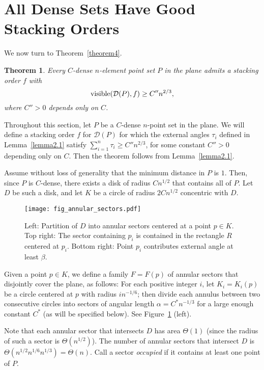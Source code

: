 \documentclass[11pt]{article}
\newtheorem{thm}{Theorem}             \newtheorem{lem}[thm]{Lemma}
\DeclareMathOperator{\vis}{\mathrm{visible}}
\begin{document}
\section{All Dense Sets Have Good Stacking Orders}

We now turn to Theorem~\ref{theorem4}.

{
\renewcommand{\thethm}{4}
\begin{thm} Every $C$-dense $n$-element point set $P$ in the plane admits a stacking order $f$ with
$$ \vis({\cal D}(P),f)\ge C''n^{2/3},$$
where $C''>0$ depends only on $C$.
\end{thm}
\addtocounter{thm}{-1}
}

Throughout this section, let $P$ be a $C$-dense $n$-point set
in the plane. We will define a stacking order $f$ for $\mathcal D(P)$ for
which the
external angles $\tau_i$ defined in Lemma~\ref{lemma2.1} satisfy
$\sum_{i=1}^n \tau_i \ge C''n^{2/3}$, for some constant
$C''>0$ depending only on $C$. Then the theorem follows from
Lemma~\ref{lemma2.1}.

Assume without loss of generality that the minimum  distance in
$P$ is $1$. Then, since $P$ is $C$-dense, there exists a disk
of radius $C n^{1/2}$ that contains all of $P$. Let $D$ be such
a disk, and let $K$ be a circle of radius $2Cn^{1/2}$
concentric with $D$.

\begin{figure}
\centerline{\texttt{[image: fig\_annular\_sectors.pdf]}}
\caption{\label{fig_annular_sectors}Left: Partition of $D$ into annular sectors
centered at a point $p\in K$. Top right: The sector containing $p_i$ is contained in
the rectangle $R$ centered at $p_i$. Bottom right: Point $p_i$ contributes
external angle at least $\beta$.}
\end{figure}

Given a point $p\in K$, we define a family $F = F(p)$  of
annular sectors that disjointly cover the plane, as follows:
For each positive integer $i$, let $K_i = K_i(p)$ be a circle
centered at $p$ with radius $i n^{-1/6}$; then divide each
annulus between two consecutive circles into sectors of angular
length $\alpha = C^* n^{-1/3}$ for a large enough constant
$C^*$ (as will be specified below). See
Figure~\ref{fig_annular_sectors} (left).

Note that each annular sector that intersects $D$ has area
$\Theta(1)$ (since the radius of such a sector is $\Theta(n^{1/2})$).
The number of annular sectors that intersect $D$ is $\Theta(n^{1/2} n^{1/6} n^{1/3}) =\Theta(n)$.
Call a sector \emph{occupied} if it contains at
least one point of $P$.
\end{document}
